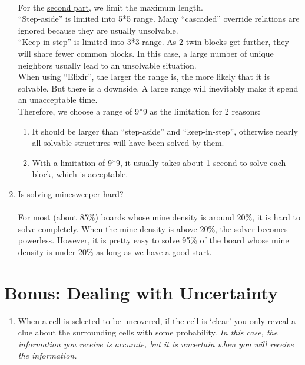 \documentclass[letter]{article}
\begin{document}
\begin{enumerate}
	\\
	For the \hyperref[secondpart]{second part}, we limit the maximum length. \\
	“Step-aside” is limited into 5*5 range. Many “cascaded” override relations are ignored because they are usually unsolvable. \\
	“Keep-in-step” is limited into 3*3 range. As 2 twin blocks get further, they will share fewer common blocks. In this case, a large number of unique neighbors usually lead to an unsolvable situation. \\
	When using “Elixir”, the larger the range is, the more likely that it is solvable. But there is a downside. A large range will inevitably make it spend an unacceptable time. \\
	Therefore, we choose a range of 9*9 as the limitation for 2 reasons: 
	\begin{enumerate}
		\item {It should be larger than “step-aside” and “keep-in-step”, otherwise nearly all solvable structures will have been solved by them.}
		\item {With a limitation of 9*9, it usually takes about 1 second to solve each block, which is acceptable.}
	\end{enumerate}

	\item {Is solving minesweeper hard?} \\
	\\
	For most (about 85\%) boards whose mine density is around 20\%, it is hard to solve completely. When the mine density is above 20\%, the solver becomes powerless. However, it is pretty easy to solve 95\% of the board whose mine density is under 20\% as long as we have a good start.
\end{enumerate}

\section{Bonus: Dealing with Uncertainty}
\begin{enumerate}
	\label{zhichao2}
	\item {When a cell is selected to be uncovered, if the cell is ‘clear’ you only reveal a clue about the surrounding cells with some probability. \textit{In this case, the information you receive is accurate, but it is uncertain when you will receive the information.}}
\end{enumerate}
\end{document}
